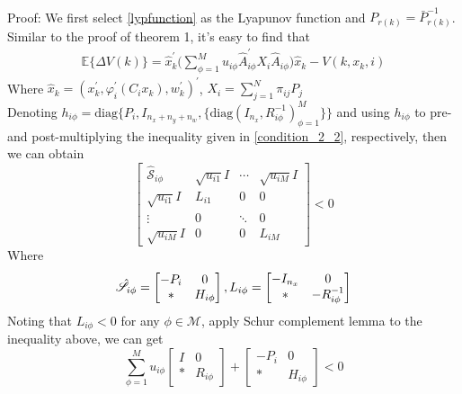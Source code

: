 \documentclass[conference]{IEEEtran}
\begin{document}
\\
Proof: We first select \eqref{lypfunction} as the Lyapunov function and $P_{r(k)}=\bar{P}^{-1}_{r(k)}$. Similar to the proof of theorem 1, it's easy to find that
\begin{equation}
	\begin{split}
		\mathbb{E}\{\varDelta V(k)\}=\hat{x}^{'}_{k} \Big( \sum_{\phi=1}^{M}u_{i\phi}\hat{A}^{'}_{i\phi}X_{i}\hat{A}_{i\phi}\Big) \hat{x}_{k} -V(k,x_k,i)
	\end{split}
\end{equation}
Where $\hat{x}_{k}=(x^{'}_{k},\varphi^{'}_{i}(C_{i}x_{k}),w^{'}_{k})^{'}$, $ X_{i}=\sum_{j=1}^{N}\pi_{ij}P_{j}$ \\
Denoting $h_{i\phi} = \mathrm{diag}\{P_{i}, I_{n_x+n_y+n_w},\{\mathrm{diag}(I_{n_x},R^{-1}_{i\phi})^{M}_{\phi=1} \} \}$ and using $h_{i\phi}$ to pre- and post-multiplying the inequality given in \eqref{condition_2_2}, respectively, then we can obtain \\
\begin{equation}\nonumber
\begin{bmatrix} 
\hat{\mathscr{S}}_{i\phi}&
\sqrt{u_{i1}}I&
\cdots&
\sqrt{u_{iM}}I\\
\sqrt{u_{i1}}I&L_{i1}&0&0\\ 
\vdots&0&\ddots&0\\
\sqrt{u_{iM}}I&0&0&
L_{iM}

\end{bmatrix} <0
\end{equation}
Where 
\begin{equation} \notag
\begin{aligned}
\hat{\mathscr{S}}_{i\phi}=\begin{bmatrix}
-P_{i }&0\\
*&H_{i\phi}
\end{bmatrix},
L_{i\phi} = \begin{bmatrix}
-I_{n_x}&0\\
*&-R^{-1}_{i\phi}
\end{bmatrix}
\end{aligned}
\end{equation}
Noting that $L_{i\phi}<0$ for any $\phi\in \mathcal{M}$, apply Schur complement lemma to the inequality above, we can get \\
\begin{equation} \label{cons2}
\sum_{\phi=1}^{M}u_{i\phi} \begin{bmatrix}
I&0\\
*&R_{i\phi}
\end{bmatrix} + \begin{bmatrix}
-P_{i }&0\\
*&H_{i\phi}
\end{bmatrix} <0
\end{equation}
\end{document}
